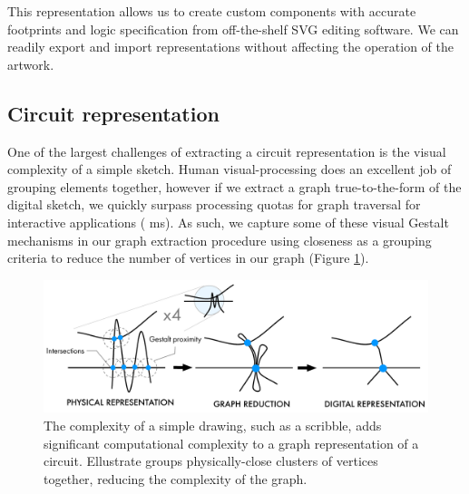 \documentclass{sigchi}
\begin{document}
    This representation allows us to create custom components with accurate footprints and logic specification from off-the-shelf SVG editing software.
    We can readily export and import representations without affecting the operation of the artwork. 

    \subsection{Circuit representation}
      One of the largest challenges of extracting a circuit representation is the visual complexity of a simple sketch. Human visual-processing does an excellent job of grouping elements together, however if we extract a graph true-to-the-form of the digital sketch, we quickly surpass processing quotas for graph traversal for interactive applications ( ms). As such, we capture some of these visual Gestalt mechanisms in our graph extraction procedure using closeness as a grouping criteria to reduce the number of vertices in our graph (Figure \ref{fig:gestalt}). 

      \begin{figure}[t]
        \centering
        \includegraphics[width=1.0\columnwidth]{figures/gestalt.pdf}
        \caption{The complexity of a simple drawing, such as a scribble, adds significant computational complexity to a graph representation of a circuit. Ellustrate groups physically-close clusters of vertices together, reducing the complexity of the graph. }
        \label{fig:gestalt}
        \vspace{-16pt}
      \end{figure}
\end{document}
